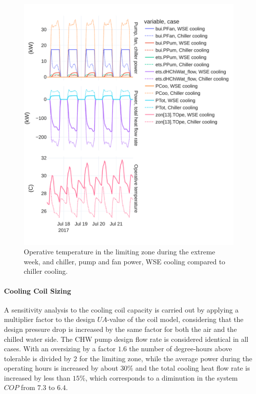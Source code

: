 \begin{figure}[!htbp]
    \centering
    \includegraphics[width=.7\linewidth]{../python_scripts/figures/TOpe.pdf}
    \caption{Operative temperature in the limiting zone during the extreme week, and chiller, pump and fan power, WSE cooling compared to chiller cooling.}
    \label{fig:tope}
\end{figure}


\paragraph{Cooling Coil Sizing} \label{par:cooling_coil}

A sensitivity analysis to the cooling coil capacity is carried out by applying a multiplier factor to the design $UA$-value of the coil model,  considering that the design pressure drop is increased by the same factor for both the air and the chilled water side. The CHW pump design flow rate is considered identical in all cases.
With an oversizing by a factor $1.6$ the number of degree-hours above tolerable is divided by $2$ for the limiting zone, while the average power during the operating hours is increased by about $30\%$ and the total cooling heat flow rate is increased by less than $15\%$, which corresponds to a diminution in the system $COP$ from $7.3$ to $6.4$.

